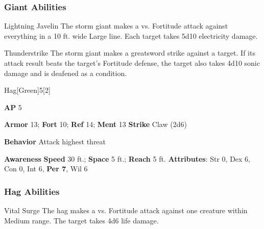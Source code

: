 \subsubsection{Giant Abilities}

\begin{ability}{Lightning Javelin}
The storm giant makes a  vs. Fortitude attack against everything in a 10 ft. wide Large line.
\hit Each target takes 5d10 electricity damage.
\end{ability}

\vspace{0.5em}
\begin{ability}{Thunderstrike}
The storm giant makes a greatsword strike against a target.
If its attack result beats the target's Fortitude defense,
the target also takes 4d10 sonic damage
and is deafened as a condition.
\end{ability}

\begin{monsection}{Hag}[Green]{5}[2]
\vspace{-1em}\vspace{-1em}
\begin{spellcontent}
\begin{spelltargetinginfo}
{\textbf{AP} 5}

\pari \textbf{Armor} 13;
\textbf{Fort} 10;
\textbf{Ref} 14;
\textbf{Ment} 13
\pari \textbf{Strike} Claw  (2d6)



\pari \textbf{Behavior} Attack highest threat
\end{spelltargetinginfo}
\end{spellcontent}

\begin{monsterfooter}
\pari \textbf{Awareness} 
\pari \textbf{Speed} 30 ft.;
\textbf{Space} 5 ft.;
\textbf{Reach} 5 ft.
\pari \textbf{Attributes}:
Str 0,
Dex 6,
Con 0,
Int 6,
\textbf{Per 7},
Wil 6
\end{monsterfooter}
\end{monsection}


\subsubsection{Hag Abilities}

\begin{ability}{Vital Surge}
The hag makes a  vs. Fortitude attack against one creature within Medium range.
\hit The target takes 4d6 life damage.
\end{ability}

